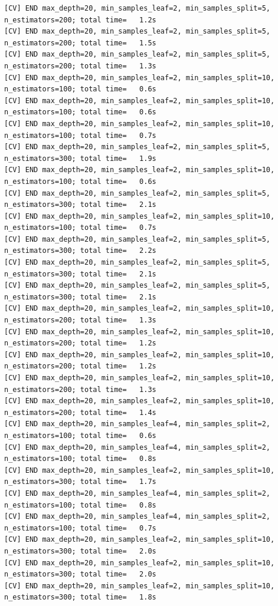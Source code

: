 \documentclass[
  11pt,
  letterpaper,
  DIV=11,
  numbers=noendperiod]{scrartcl}
\begin{document}
\begin{verbatim}
[CV] END max_depth=20, min_samples_leaf=2, min_samples_split=5, n_estimators=200; total time=   1.2s
[CV] END max_depth=20, min_samples_leaf=2, min_samples_split=5, n_estimators=200; total time=   1.5s
[CV] END max_depth=20, min_samples_leaf=2, min_samples_split=5, n_estimators=200; total time=   1.3s
[CV] END max_depth=20, min_samples_leaf=2, min_samples_split=10, n_estimators=100; total time=   0.6s
[CV] END max_depth=20, min_samples_leaf=2, min_samples_split=10, n_estimators=100; total time=   0.6s
[CV] END max_depth=20, min_samples_leaf=2, min_samples_split=10, n_estimators=100; total time=   0.7s
[CV] END max_depth=20, min_samples_leaf=2, min_samples_split=5, n_estimators=300; total time=   1.9s
[CV] END max_depth=20, min_samples_leaf=2, min_samples_split=10, n_estimators=100; total time=   0.6s
[CV] END max_depth=20, min_samples_leaf=2, min_samples_split=5, n_estimators=300; total time=   2.1s
[CV] END max_depth=20, min_samples_leaf=2, min_samples_split=10, n_estimators=100; total time=   0.7s
[CV] END max_depth=20, min_samples_leaf=2, min_samples_split=5, n_estimators=300; total time=   2.2s
[CV] END max_depth=20, min_samples_leaf=2, min_samples_split=5, n_estimators=300; total time=   2.1s
[CV] END max_depth=20, min_samples_leaf=2, min_samples_split=5, n_estimators=300; total time=   2.1s
[CV] END max_depth=20, min_samples_leaf=2, min_samples_split=10, n_estimators=200; total time=   1.3s
[CV] END max_depth=20, min_samples_leaf=2, min_samples_split=10, n_estimators=200; total time=   1.2s
[CV] END max_depth=20, min_samples_leaf=2, min_samples_split=10, n_estimators=200; total time=   1.2s
[CV] END max_depth=20, min_samples_leaf=2, min_samples_split=10, n_estimators=200; total time=   1.3s
[CV] END max_depth=20, min_samples_leaf=2, min_samples_split=10, n_estimators=200; total time=   1.4s
[CV] END max_depth=20, min_samples_leaf=4, min_samples_split=2, n_estimators=100; total time=   0.6s
[CV] END max_depth=20, min_samples_leaf=4, min_samples_split=2, n_estimators=100; total time=   0.8s
[CV] END max_depth=20, min_samples_leaf=2, min_samples_split=10, n_estimators=300; total time=   1.7s
[CV] END max_depth=20, min_samples_leaf=4, min_samples_split=2, n_estimators=100; total time=   0.8s
[CV] END max_depth=20, min_samples_leaf=4, min_samples_split=2, n_estimators=100; total time=   0.7s
[CV] END max_depth=20, min_samples_leaf=2, min_samples_split=10, n_estimators=300; total time=   2.0s
[CV] END max_depth=20, min_samples_leaf=2, min_samples_split=10, n_estimators=300; total time=   2.0s
[CV] END max_depth=20, min_samples_leaf=2, min_samples_split=10, n_estimators=300; total time=   1.8s

\end{verbatim}
\end{document}
